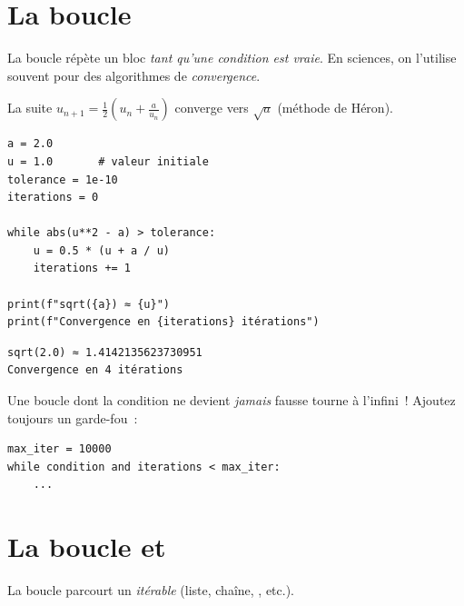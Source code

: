 \section{La boucle }

La boucle  r\'ep\`ete un bloc \emph{tant qu'une condition est vraie}.
En sciences, on l'utilise souvent pour des algorithmes de \emph{convergence}.

\begin{exemple}
La suite $u_{n+1} = \frac{1}{2}\left(u_n + \frac{a}{u_n}\right)$ converge vers $\sqrt{a}$
(m\'ethode de H\'eron).
\end{exemple}

\begin{codeblock}[title=\textbf{Python}]
\begin{verbatim}
a = 2.0
u = 1.0       # valeur initiale
tolerance = 1e-10
iterations = 0

while abs(u**2 - a) > tolerance:
    u = 0.5 * (u + a / u)
    iterations += 1

print(f"sqrt({a}) ≈ {u}")
print(f"Convergence en {iterations} itérations")
\end{verbatim}
\end{codeblock}

\begin{codeoutput}
\begin{verbatim}
sqrt(2.0) ≈ 1.4142135623730951
Convergence en 4 itérations
\end{verbatim}
\end{codeoutput}

\begin{attention}
Une boucle  dont la condition ne devient \emph{jamais} fausse tourne
\`a l'infini~! Ajoutez toujours un garde-fou~:
\begin{verbatim}
max_iter = 10000
while condition and iterations < max_iter:
    ...
\end{verbatim}
\end{attention}

\section{La boucle  et }

La boucle  parcourt un \emph{it\'erable} (liste, cha\^ine, , etc.).

